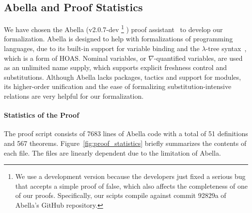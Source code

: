 \subsection{Abella and Proof Statistics}
We have chosen the Abella (v2.0.7-dev
\footnote{We use a development version because the developers
just fixed a serious bug that accepts a simple proof of false,
which also affects the completeness of one of our proofs.
Specifically, our scipts compile against commit 92829a of Abella's GitHub repository.}
) proof assistant~\cite{AbellaDesc} to develop our formalization.
Abella is designed to help with formalizations of programming languages,
due to its built-in support for variable binding and
the $\lambda$-tree syntax~\cite{miller2000abstract}, which is a form of HOAS.
Nominal variables, or $\nabla$-quantified variables, are used as an unlimited name supply,
which supports explicit freshness control and substitutions.
Although Abella lacks packages, tactics and support for modules,
its higher-order unification and the ease of formalizing substitution-intensive relations
are very helpful for our formalization.

\paragraph{Statistics of the Proof}
The proof script consists of 7683 lines of Abella code with a total of
51 definitions and 567 theorems.
Figure~\ref{fig:proof_statistics} briefly summarizes the contents of each file.
The files are linearly dependent due to the limitation of Abella.

